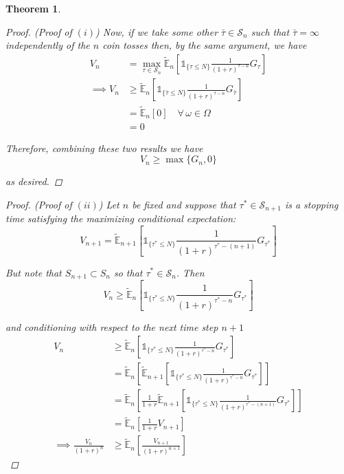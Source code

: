 \documentclass[12pt]{article}
\newtheorem{theorem}{Theorem}
\newlength\tindent
\renewcommand{\indent}{\hspace*{\tindent}}
\newcommand{\E}{\mathbb E}
\begin{document}
\begin{theorem}
\begin{proof} {\em (Proof of $(i)$)}
\indent Now, if we take some other $\bar{\tau} \in \mathcal S_n$ such that $\bar{\tau} = \infty$ independently of the $n$ coin tosses then, by the same argument, we have
\begin{align*}
	V_n &= \max_{\tau \in \mathcal S_n} \tilde{\E}_n \left[ \mathds 1_{\{\tau\leq N\}} \frac{1}{(1 + r)^{\tau - n}} G_\tau \right] \\
	\implies V_n &\geq \tilde{\E}_n \left[ \mathds 1_{\{\bar{\tau} \leq N\}} \frac{1}{(1 + r)^{\bar{\tau} - n}} G_{\bar{\tau}} \right] \\
	&= \tilde{\E}_n [0] \quad \forall\,\omega\in\Omega \\
	&= 0
\end{align*}

Therefore, combining these two results we have
\begin{equation*}
	V_n \geq \max \{ G_n, 0\}
\end{equation*}

as desired.
\end{proof}

\begin{proof} {\em (Proof of $(ii)$)} Let $n$ be fixed and suppose that $\tau^*\in \mathcal S_{n + 1}$ is a stopping time satisfying the maximizing conditional expectation:
\begin{equation*}
	V_{n + 1} = \tilde{\E}_{n + 1} \left[ \mathds 1_{\{\tau^*\leq N\}} \frac{1}{(1 + r)^{\tau^* - (n + 1)}} G_{\tau^*} \right] 
\end{equation*}

But note that $S_{n + 1} \subset S_n$ so that $\tau^* \in \mathcal S_n$. Then
\begin{equation*}
	V_n \geq \tilde{\E}_{n} \left[ \mathds 1_{\{\tau^*\leq N\}} \frac{1}{(1 + r)^{\tau^* - n}} G_{\tau^*} \right] 
\end{equation*}

and conditioning with respect to the next time step $n + 1$ 
\begin{align*}
	V_n &\geq \tilde{\E}_{n} \left[ \mathds 1_{\{\tau^*\leq N\}} \frac{1}{(1 + r)^{\tau^* - n}} G_{\tau^*} \right]  \\
	&= \tilde{\E}_{n} \left[ \tilde{\E}_{n + 1} \left[ \mathds 1_{\{\tau^*\leq N\}} \frac{1}{(1 + r)^{\tau^* - n}} G_{\tau^*} \right] \right] \\
	&= \tilde{\E}_{n} \left[ \frac{1}{1 + r} \tilde{\E}_{n + 1} \left[ \mathds 1_{\{\tau^*\leq N\}} \frac{1}{(1 + r)^{\tau^* - (n + 1)}} G_{\tau^*} \right] \right] \\
	&= \tilde{\E}_{n} \left[ \frac{1}{1 + r} V_{n + 1} \right]  \\
	\implies \frac{V_n}{(1 + r)^n} &\geq \tilde{\E}_n \left[ \frac{V_{n + 1}}{(1 + r)^{n + 1}} \right]
\end{align*}


\end{proof}
\end{theorem}
\end{document}
